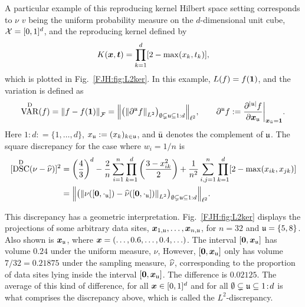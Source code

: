 \documentclass[graybox,footinfo]{svmult}
\DeclareMathOperator{\disc}{DSC}
\DeclareMathOperator{\Var}{VAR}
\begin{document}
A particular example of this reproducing kernel Hilbert space setting corresponds to 
$\nu$ $v$ being the uniform probability measure on the $d$-dimensional unit cube, $\mathcal{X} 
= 
[0,1]^d$, and the reproducing kernel defined by \cite{Hic97a}
\begin{equation} \label{FJH:eq:L2Kdef}
K(\bsx,\bst) =\prod_{k = 1}^d [2 - \max(x_k,t_k)],
\end{equation}
which is plotted in Fig.\ \ref{FJH:fig:L2ker}.  In this example, $L(f) = f({\boldsymbol{1}})$, and the 
variation is defined as
\begin{equation*}
\Var^\Dt(f)  = \norm{f-f(\bsone)}_\cf = \Bigl \lVert \bigl ( \norm{\partial^\fraku f}_{L^2}\bigr 
)_{\emptyset \subsetneq \fraku \subseteq 1:d} \Bigr \rVert_{\ell^2} , \qquad 
\partial^\fraku f : = \frac{\partial^{\lvert\fraku\rvert} f}{\partial \bsx_\fraku} \biggr 
\rvert_{\bsx_{\bar{\fraku}} = \bsone}.
\end{equation*}
Here $1\!:\!d : = \{1, \ldots, d\}$, $x_{\mathfrak{u}} := (x_k)_{k \in {\mathfrak{u}}}$, and $\bar{{\mathfrak{u}}}$ 
denotes the complement of ${\mathfrak{u}}$.  
The square discrepancy for the case where $w_i = 1/n$ is
\begin{align}
\nonumber
[\disc^\Dt(\nu - \hnu)]^2  &= \left(\frac 43\right)^d - \frac{2}n \sum_{i=1}^n \prod_{k=1}^d 
\left (\frac{3 - x_{ik}^2}{2} \right) + \frac{1}{n^2}\sum_{i,j=1}^n \prod_{k = 1}^d [2 - 
\max(x_{ik},x_{jk})] 
\\ &= \Bigl \lVert \bigl ( \norm{\nu([\bszero,\cdot_\fraku]) - 
	\hnu([\bszero,\cdot_\fraku])}_{L^2}\bigr )_{\emptyset \subsetneq \fraku \subseteq 1:d} 
	\Bigr 
	\rVert_{\ell^2}. \label{FJH:eq:L2disc}
\end{align}

This discrepancy has a geometric interpretation. Fig.\ \ref{FJH:fig:L2ker} displays the 
projections of some arbitrary 
data sites, ${\boldsymbol{x}}_{1,{\mathfrak{u}}}, \ldots, {\boldsymbol{x}}_{n,{\mathfrak{u}}}$, for $n=32$ and ${\mathfrak{u}} = \{5,8\}$.  
Also 
shown is ${\boldsymbol{x}}_{\mathfrak{u}}$, where ${\boldsymbol{x}} = (\ldots, 0.6, \ldots, 0.4, \ldots)$. The interval 
$[{\boldsymbol{0}},{\boldsymbol{x}}_{\mathfrak{u}}]$ has volume $0.24$ under the uniform measure, $\nu$, However, 
$[{\boldsymbol{0}},{\boldsymbol{x}}_{\mathfrak{u}}]$ only has 
volume $7/32 = 0.21875$ under the sampling measure, $\widehat{\nu}$, corresponding to the 
proportion of data sites lying inside the interval $[{\boldsymbol{0}},{\boldsymbol{x}}_{\mathfrak{u}}]$. The difference is 
$0.02125$.  The average of this kind of difference, for all ${\boldsymbol{x}} \in [0,1]^d$ and for all 
$\emptyset \subsetneq {\mathfrak{u}} 
\subseteq 1\!:\!d$ is what comprises the discrepancy above, which is called the 
$L^2$-discrepancy.
\end{document}
